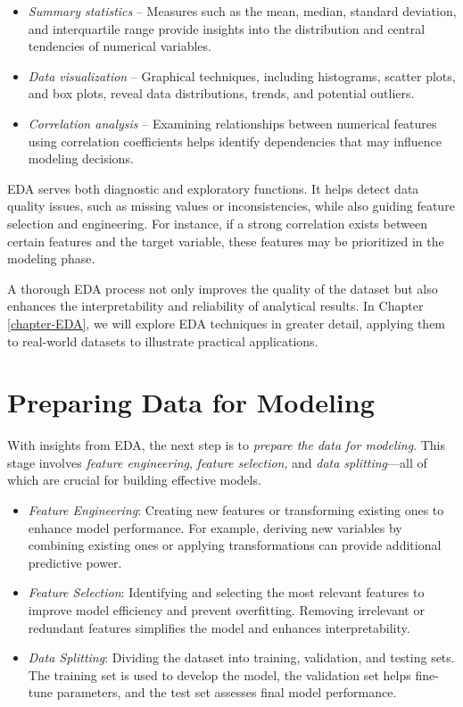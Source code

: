 \documentclass[
  11pt,
]{book}
\providecommand{\tightlist}{%
  \setlength{\itemsep}{0pt}\setlength{\parskip}{0pt}}
\theoremstyle{definition}
\theoremstyle{definition}
\theoremstyle{definition}
\theoremstyle{definition}
\theoremstyle{remark}
\begin{document}
\begin{itemize}
\tightlist
\item
  \emph{Summary statistics} -- Measures such as the mean, median, standard deviation, and interquartile range provide insights into the distribution and central tendencies of numerical variables.\\
\item
  \emph{Data visualization} -- Graphical techniques, including histograms, scatter plots, and box plots, reveal data distributions, trends, and potential outliers.\\
\item
  \emph{Correlation analysis} -- Examining relationships between numerical features using correlation coefficients helps identify dependencies that may influence modeling decisions.
\end{itemize}

EDA serves both diagnostic and exploratory functions. It helps detect data quality issues, such as missing values or inconsistencies, while also guiding feature selection and engineering. For instance, if a strong correlation exists between certain features and the target variable, these features may be prioritized in the modeling phase.

A thorough EDA process not only improves the quality of the dataset but also enhances the interpretability and reliability of analytical results. In Chapter \ref{chapter-EDA}, we will explore EDA techniques in greater detail, applying them to real-world datasets to illustrate practical applications.

\section{Preparing Data for Modeling}\label{preparing-data-for-modeling}

With insights from EDA, the next step is to \emph{prepare the data for modeling}. This stage involves \emph{feature engineering}, \emph{feature selection}, and \emph{data splitting}---all of which are crucial for building effective models.

\begin{itemize}
\tightlist
\item
  \emph{Feature Engineering}: Creating new features or transforming existing ones to enhance model performance. For example, deriving new variables by combining existing ones or applying transformations can provide additional predictive power.\\
\item
  \emph{Feature Selection}: Identifying and selecting the most relevant features to improve model efficiency and prevent overfitting. Removing irrelevant or redundant features simplifies the model and enhances interpretability.\\
\item
  \emph{Data Splitting}: Dividing the dataset into training, validation, and testing sets. The training set is used to develop the model, the validation set helps fine-tune parameters, and the test set assesses final model performance.
\end{itemize}
\end{document}
